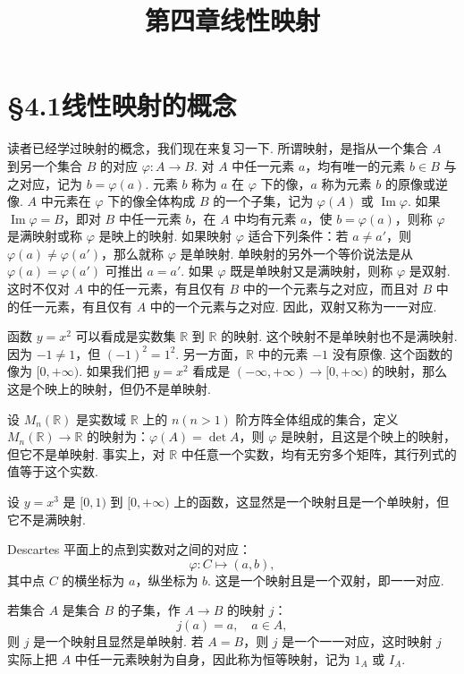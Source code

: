 \documentclass[UTF8, 12pt, fontset=fandol, oneside]{ctexart}
\title{第四章\quad 线性映射}
\author{}
\date{}
\begin{document}
\maketitle

\section*{§4.1\quad 线性映射的概念}

读者已经学过映射的概念，我们现在来复习一下. 所谓映射，是指从一个集合 $A$ 到另一个集合 $B$ 的对应 $\varphi:A\to B$. 对 $A$ 中任一元素 $a$，均有唯一的元素 $b\in B$ 与之对应，记为 $b=\varphi(a)$. 元素 $b$ 称为 $a$ 在 $\varphi$ 下的像，$a$ 称为元素 $b$ 的原像或逆像. $A$ 中元素在 $\varphi$ 下的像全体构成 $B$ 的一个子集，记为 $\varphi(A)$ 或 $\operatorname{Im}\varphi$. 如果 $\operatorname{Im}\varphi=B$，即对 $B$ 中任一元素 $b$，在 $A$ 中均有元素 $a$，使 $b=\varphi(a)$，则称 $\varphi$ 是满映射或称 $\varphi$ 是映上的映射. 如果映射 $\varphi$ 适合下列条件：若 $a\neq a'$，则 $\varphi(a)\neq\varphi(a')$，那么就称 $\varphi$ 是单映射. 单映射的另外一个等价说法是从 $\varphi(a)=\varphi(a')$ 可推出 $a=a'$. 如果 $\varphi$ 既是单映射又是满映射，则称 $\varphi$ 是双射. 这时不仅对 $A$ 中的任一元素，有且仅有 $B$ 中的一个元素与之对应，而且对 $B$ 中的任一元素，有且仅有 $A$ 中的一个元素与之对应. 因此，双射又称为一一对应.

函数 $y=x^2$ 可以看成是实数集 $\mathbb{R}$ 到 $\mathbb{R}$ 的映射. 这个映射不是单映射也不是满映射. 因为 $-1\neq 1$，但 $(-1)^2=1^2$. 另一方面，$\mathbb{R}$ 中的元素 $-1$ 没有原像. 这个函数的像为 $[0,+\infty)$. 如果我们把 $y=x^2$ 看成是 $(-\infty,+\infty)\to[0,+\infty)$ 的映射，那么这是个映上的映射，但仍不是单映射.

设 $M_n(\mathbb{R})$ 是实数域 $\mathbb{R}$ 上的 $n(n>1)$ 阶方阵全体组成的集合，定义 $M_n(\mathbb{R})\to\mathbb{R}$ 的映射为：$\varphi(A)=\det A$，则 $\varphi$ 是映射，且这是个映上的映射，但它不是单映射. 事实上，对 $\mathbb{R}$ 中任意一个实数，均有无穷多个矩阵，其行列式的值等于这个实数.

设 $y=x^3$ 是 $[0,1)$ 到 $[0,+\infty)$ 上的函数，这显然是一个映射且是一个单映射，但它不是满映射.

Descartes 平面上的点到实数对之间的对应：
\[
\varphi:C\mapsto(a,b),
\]
其中点 $C$ 的横坐标为 $a$，纵坐标为 $b$. 这是一个映射且是一个双射，即一一对应.

若集合 $A$ 是集合 $B$ 的子集，作 $A\to B$ 的映射 $j$：
\[
j(a)=a,\quad a\in A,
\]
则 $j$ 是一个映射且显然是单映射. 若 $A=B$，则 $j$ 是一个一一对应，这时映射 $j$ 实际上把 $A$ 中任一元素映射为自身，因此称为恒等映射，记为 $1_A$ 或 $I_A$.
\end{document}
